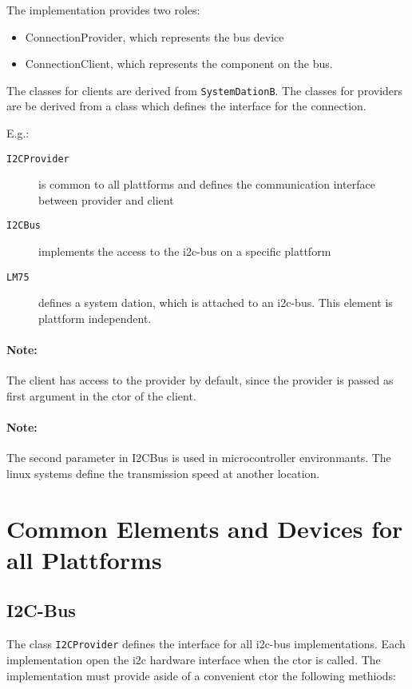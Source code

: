 The implementation provides two roles:
\begin{itemize}
\item ConnectionProvider, which represents the bus device
\item ConnectionClient, which represents the component on the bus.
\end{itemize}

The classes for clients are derived from \texttt{SystemDationB}.
The classes for providers are be derived from a class which
defines the interface for the connection. 

E.g.:
\begin{description} 
\item[ \texttt{I2CProvider} ] is common to all plattforms
   and defines the communication interface between provider and client
\item[ \texttt{I2CBus}] implements the access to the i2c-bus on a 
   specific plattform
\item[ \texttt{LM75} ] defines a system dation, which is attached to an i2c-bus.
    This element is plattform independent.
\end{description}

\paragraph{Note:} The client has access to the provider by default, since
the provider is passed as first argument in the ctor of the client.

\paragraph{Note:} The second parameter in I2CBus is used in microcontroller
   environmants. The linux systems define the transmission speed at
   another location.

\section{Common Elements and Devices for all Plattforms}
\subsection{I2C-Bus}
The class \texttt{I2CProvider} defines the interface for all i2c-bus 
implementations. Each implementation open the i2c hardware interface 
when the ctor is called. The implementation must provide aside of a
convenient ctor the following methiods:

